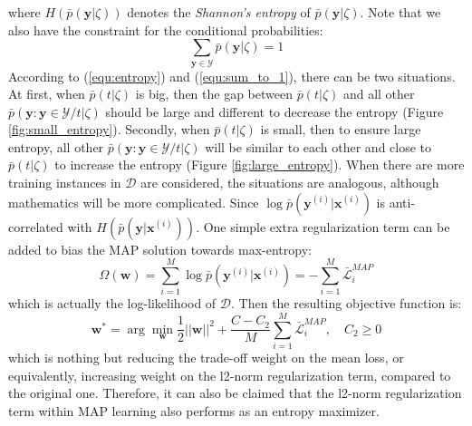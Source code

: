 where $H(\bar p(\mathbf{y}|\zeta))$ denotes the \emph{Shannon's entropy} of $\bar p(\mathbf{y}|\zeta)$. Note that we also have the constraint for the conditional probabilities:   
\begin{equation}
    \sum_{\mathbf{y}\in{\mathcal{Y}}} \bar p(\mathbf{y}|\zeta)=1
    \label{equ:sum_to_1}
\end{equation}
According to (\ref{equ:entropy}) and (\ref{equ:sum_to_1}), there can be two situations. At first, when $\bar p(t|\zeta)$ is big, then the gap between $\bar p(t|\zeta)$ and all other  
$\bar p(\mathbf{y}:\mathbf{y}\in\mathcal{Y}/t|\zeta)$ should be large and different to decrease the entropy (Figure \ref{fig:small_entropy}). Secondly, when $\bar p(t|\zeta)$ is small,       
then to ensure large entropy, all other $\bar p(\mathbf{y}:\mathbf{y}\in\mathcal{Y}/t|\zeta)$ will be similar to each other and close to $\bar p(t|\zeta)$ to increase the 
entropy (Figure \ref{fig:large_entropy}).  
When there are more training instances in $\mathcal{D}$ are considered, the situations are analogous, although mathematics will be more complicated.    
Since $\log \bar p(\mathbf{y}^{(i)}|\mathbf{x}^{(i)})$  
is anti-correlated with $H(\bar p(\mathbf{y}|\mathbf{x}^{(i)}))$.  One simple extra regularization term can be added to bias the MAP solution towards max-entropy:    
\begin{equation}
    \Omega(\mathbf{w})=\sum_{i=1}^M\log \bar p(\mathbf{y}^{(i)}|\mathbf{x}^{(i)})=-\sum_{i=1}^M \bar{\mathcal{L}}^{MAP}_i
\end{equation}
which is actually the log-likelihood of $\mathcal{D}$. Then the resulting objective function is: 
\begin{equation}  
    \mathbf{w}^* =\arg\min_{\mathbf{w}} \frac{1}{2} ||\mathbf{w}||^2+  \frac{C-C_2}{M}\sum_{i=1}^M \bar{\mathcal{L}}^{MAP}_i, \quad C_2\geq0
       \label{equ:MEnMAP}
\end{equation}
which is nothing but reducing the trade-off weight on the mean loss, or equivalently, increasing weight on the l2-norm regularization term, compared to the 
original one.    
Therefore, it can also be claimed that the l2-norm regularization term within MAP learning also performs as an entropy maximizer.  
